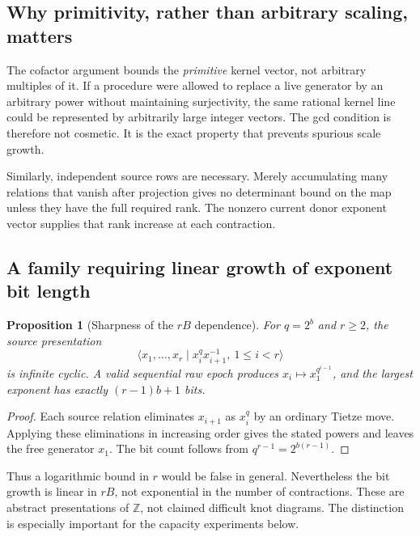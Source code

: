 \documentclass[11pt,letterpaper]{article}
\newtheorem{proposition}[theorem]{Proposition}
\theoremstyle{definition}
\theoremstyle{remark}\newtheorem{remark}[theorem]{Remark}
\newcommand{\Z}{\mathbb Z}\newcommand{\Q}{\mathbb Q}
\begin{document}
\subsection{Why primitivity, rather than arbitrary scaling, matters}

The cofactor argument bounds the \emph{primitive} kernel vector, not arbitrary
multiples of it. If a procedure were allowed to replace a live generator by
an arbitrary power without maintaining surjectivity, the same rational kernel
line could be represented by arbitrarily large integer vectors. The gcd
condition is therefore not cosmetic. It is the exact property that prevents
spurious scale growth.

Similarly, independent source rows are necessary. Merely accumulating many
relations that vanish after projection gives no determinant bound on the map
unless they have the full required rank. The nonzero current donor exponent
vector supplies that rank increase at each contraction.

\subsection{A family requiring linear growth of exponent bit length}

\begin{proposition}[Sharpness of the $rB$ dependence]
\label{prop:sharp}
For $q=2^b$ and $r\ge2$, the source presentation
\begin{equation}
 \langle x_1,\ldots,x_r\mid x_i^q x_{i+1}^{-1},\ 1\le i<r\rangle
 \label{eq:chain}
\end{equation}
is infinite cyclic. A valid sequential raw epoch produces
$x_i\mapsto x_1^{q^{i-1}}$, and the largest exponent has exactly
$(r-1)b+1$ bits.
\end{proposition}
\begin{proof}
Each source relation eliminates $x_{i+1}$ as $x_i^q$ by an ordinary Tietze
move. Applying these eliminations in increasing order gives the stated powers
and leaves the free generator $x_1$. The bit count follows from
$q^{r-1}=2^{b(r-1)}$.
\end{proof}

Thus a logarithmic bound in $r$ would be false in general. Nevertheless the
bit growth is linear in $rB$, not exponential in the number of contractions.
These are abstract presentations of $\Z$, not claimed difficult knot diagrams.
The distinction is especially important for the capacity experiments below.
\end{document}
